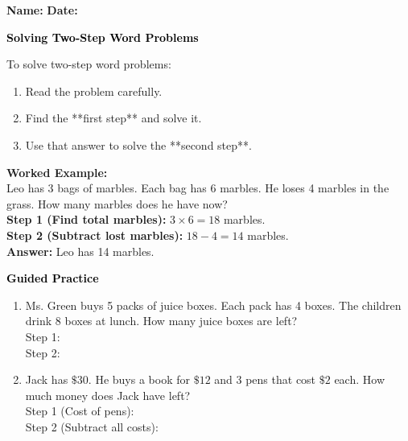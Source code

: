 \documentclass[12pt, letterpaper, fleqn]{article}
\newcommand{\blanklong}{\underline{\hspace{6.5cm}}}
\begin{document}
\textbf{Name:} \underline{\hspace{5cm}}
\hfill
\textbf{Date:} \underline{\hspace{3cm}}\\

\begin{tcolorbox}[colback=customteal!20]
    \large\textcolor{black}{\textbf{Solving Two-Step Word Problems}}
\end{tcolorbox}

\vspace{3mm}
\noindent
To solve two-step word problems:
\begin{enumerate}
    \item Read the problem carefully.
    \item Find the **first step** and solve it.
    \item Use that answer to solve the **second step**.
\end{enumerate}

\vspace{3mm}
\begin{tcolorbox}[colback=white, colframe=black!25, boxrule=0.6pt, arc=4mm]
\textbf{Worked Example:}
\\
Leo has 3 bags of marbles. Each bag has 6 marbles. He loses 4 marbles in the grass. How many marbles does he have now?
\\
\textbf{Step 1 (Find total marbles):} $3 \times 6 = 18$ marbles.
\\
\textbf{Step 2 (Subtract lost marbles):} $18 - 4 = 14$ marbles.
\\
\textbf{Answer:} Leo has 14 marbles.
\end{tcolorbox}

\newpage
\begin{tcolorbox}[colback=customteal!20]
    \large\textcolor{black}{\textbf{Guided Practice}}
\end{tcolorbox}

\vspace{5mm}
\begin{enumerate}[itemsep=4cm, leftmargin=0.6cm]
\item Ms. Green buys 5 packs of juice boxes. Each pack has 4 boxes. The children drink 8 boxes at lunch. How many juice boxes are left?
\\
Step 1: \blanklong \\
Step 2: \blanklong

\item Jack has $\$30$. He buys a book for $\$12$ and 3 pens that cost $\$2$ each. How much money does Jack have left?
\\
Step 1 (Cost of pens): \blanklong \\
Step 2 (Subtract all costs): \blanklong
\end{enumerate}
\end{document}
